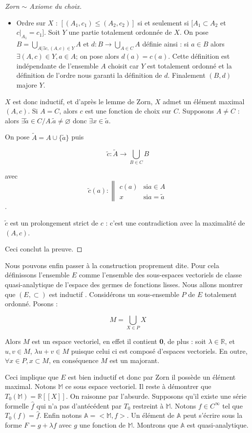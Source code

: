 \documentclass[12pt,a4paper]{amsart}
\begin{document}
\begin{proof}[Zorn $\sim$ Axiome du choix]
\begin{itemize}
\item Ordre sur $X$ : $[(A_{1},c_{1}) \leq (A_{2},c_{2})]$ si et seulement si $[A_{1}\subset A_{2}$ et $ c|_{A_{1}} =c_{1}]$. Soit $Y$ une partie totalement ordonnée de $X$. On pose $B= \bigcup_{A|\exists c, (A,c) \in Y}A$ et $d : B \rightarrow \bigcup_{A \in C}A$ définie ainsi : si $a \in B$ alors $\exists (A,c)\in Y , a \in A$; on pose alors $d(a) = c(a) $. Cette définition est indépendante de l'ensemble $A$ choisit car $Y$ est totalement ordonné et la définition de l'ordre nous garanti la définition de $d$. Finalement $(B,d)$ majore $Y$. 

\end{itemize}
$X$ est donc inductif, et d'après le lemme de Zorn, $X$ admet un élément maximal $(A,c)$. Si $A=C$, alors $c$ est une fonction de choix sur $C$. Supposons $A \neq C$ : alors $\exists \tilde{a}\in C/A. \tilde{a}\neq \varnothing $ donc $\exists x \in \tilde{a}$. 

On pose $\tilde{A}= A\cup \{\tilde{a}\}$ puis 

$$ \tilde{c} : \tilde{A}\rightarrow \bigcup_{B\in C} B $$ 

avec 
$$
\tilde{c}(a) : \left\|
    \begin{array}{ll}
       c(a) & \mbox{si} a\in A  \\
       x & \mbox{si} a = \tilde{a}
    \end{array}
\right.
$$. 

$\tilde{c} $ est un prolongement strict de $c$ : c'est une contradiction avec la maximalité de $(A,c)$. 

Ceci conclut la preuve. 
\end{proof} 

Nous pouvons enfin passer à la construction proprement dite. Pour cela définissons l'ensemble $E$ comme l'ensemble des sous-espaces vectoriels de classe quasi-analytique de l'espace des germes de fonctions lisses. Nous allons montrer que $(E,\subset) $ est inductif . Considérons un sous-ensemble $P$ de $E$ totalement ordonné. Posons : 

$$M = \bigcup_{X \in P} X$$ 

Alors $M$ est un espace vectoriel, en effet il contient \textbf{0}, de plus : soit $ \lambda \in \mathbb{R}$, et $ u,v \in M $,  $\lambda u + v \in M $ puisque celui ci est composé d'espaces vectoriels. En outre, $ \forall x \in P, x \subset M $, en conséquence $M$ est un majorant. 

Ceci implique que $E$ est bien inductif et donc par Zorn il possède un élément maximal. Notons $\mathbb{M} $ ce sous espace  vectoriel. Il reste à démontrer que $ T_{0}(\mathbb{M})= \mathbb{R}[[X]]$. On raisonne par l'absurde. Supposons qu'il existe une série formelle $\hat{f}$ qui n'a pas d'antécédent par $T_{0}$ restreint à $\mathbb{M}$. Notons $f\in C^{\infty}$ tel que $T_{0}(f)=\hat{f}$. Enfin notons $ \mathbb{A}= <\mathbb{M},f>$. Un élément de $ \mathbb{A}$ peut s'écrire sous la forme $F=g +\lambda f$ avec $g$ une fonction de $\mathbb{M}$. Montrons que  $ \mathbb{A}$  est quasi-analytique.  
\end{document}
